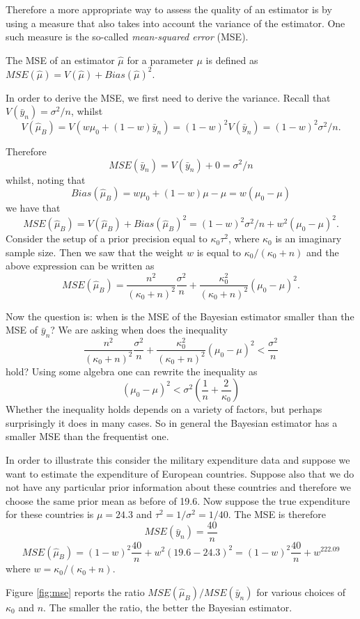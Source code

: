\documentclass[
]{book}
\begin{document}
Therefore a more appropriate way to assess the quality of an estimator is by using a measure that also takes into account the variance of the estimator. One such measure is the so-called \emph{mean-squared error} (MSE).

The MSE of an estimator \(\hat\mu\) for a parameter \(\mu\) is defined as \(MSE(\hat\mu)=V(\hat\mu)+Bias(\hat\mu)^2\).

In order to derive the MSE, we first need to derive the variance. Recall that \(V(\bar{y}_n)=\sigma^2/n\), whilst
\[
V(\hat\mu_B)=V(w\mu_0+(1-w)\bar{y}_n)=(1-w)^2V(\bar{y}_n)=(1-w)^2\sigma^2/n.
\]

Therefore
\[
MSE(\bar{y}_n)=V(\bar{y}_n)+0=\sigma^2/n
\]
whilst, noting that
\[
Bias(\hat\mu_B)=w\mu_0+(1-w)\mu-\mu=w(\mu_0-\mu)
\]
we have that
\[
MSE(\hat\mu_B)=V(\hat\mu_B)+Bias(\hat\mu_B)^2=(1-w)^2\sigma^2/n+w^2(\mu_0-\mu)^2.
\]
Consider the setup of a prior precision equal to \(\kappa_0\tau^2\), where \(\kappa_0\) is an imaginary sample size. Then we saw that the weight \(w\) is equal to \(\kappa_0/(\kappa_0+n)\) and the above expression can be written as
\[
MSE(\hat\mu_B)=\frac{n^2}{(\kappa_0+n)^2}\frac{\sigma^2}{n}+\frac{\kappa_0^2}{(\kappa_0+n)^2}(\mu_0-\mu)^2.
\]

Now the question is: when is the MSE of the Bayesian estimator smaller than the MSE of \(\bar{y}_n\)? We are asking when does the inequality
\[
\frac{n^2}{(\kappa_0+n)^2}\frac{\sigma^2}{n}+\frac{\kappa_0^2}{(\kappa_0+n)^2}(\mu_0-\mu)^2 < \frac{\sigma^2}{n}
\]
hold?
Using some algebra one can rewrite the inequality as
\[
(\mu_0-\mu)^2< \sigma^2\left(\frac{1}{n}+ \frac{2}{\kappa_0}\right)
\]
Whether the inequality holds depends on a variety of factors, but perhaps surprisingly it does in many cases. So in general the Bayesian estimator has a smaller MSE than the frequentist one.

In order to illustrate this consider the military expenditure data and suppose we want to estimate the expenditure of European countries. Suppose also that we do not have any particular prior information about these countries and therefore we choose the same prior mean as before of 19.6. Now suppose the true expenditure for these countries is \(\mu=24.3\) and \(\tau^2=1/\sigma^2=1/40\). The MSE is therefore
\[
MSE(\bar{y}_n)=\frac{40}{n}
\]
\[
MSE(\hat\mu_B)=(1-w)^2\frac{40}{n}+w^2(19.6-24.3)^2=(1-w)^2\frac{40}{n}+w^222.09
\]
where \(w=\kappa_0/(\kappa_0+n)\).

Figure \ref{fig:mse} reports the ratio \(MSE(\hat\mu_B)/MSE(\bar{y}_n)\) for various choices of \(\kappa_0\) and \(n\). The smaller the ratio, the better the Bayesian estimator.
\end{document}
